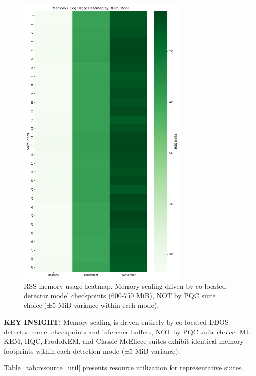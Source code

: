 \documentclass[11pt,a4paper]{article}
\begin{document}
\begin{figure}[H]
\centering
\includegraphics[width=0.75\textwidth]{../figures/figure12_rss_memory_heatmap.png}
\caption{RSS memory usage heatmap. Memory scaling driven by co-located detector model checkpoints (600-750 MiB), NOT by PQC suite choice (±5 MiB variance within each mode).}
\label{fig:rss_heatmap}
\end{figure}

\textbf{KEY INSIGHT:} Memory scaling is driven entirely by co-located DDOS detector model checkpoints and inference buffers, NOT by PQC suite choice. ML-KEM, HQC, FrodoKEM, and Classic-McEliece suites exhibit identical memory footprints within each detection mode (±5 MiB variance).

Table~\ref{tab:resource_util} presents resource utilization for representative suites.



\end{document}
